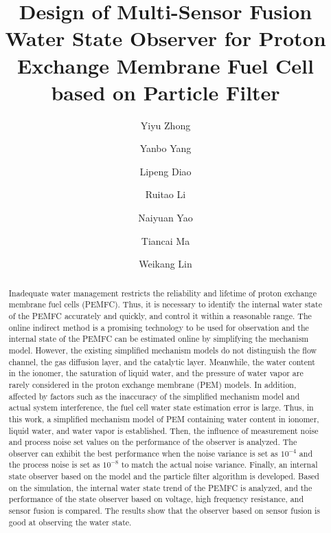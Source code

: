\documentclass[preprint]{elsarticle}
\title{Design of Multi-Sensor Fusion Water State Observer for Proton Exchange Membrane Fuel Cell based on Particle Filter}
\author[a]{Yiyu Zhong}
\author[a]{Yanbo Yang\corref{mycorrespondingauthor}}
\author[c]{Lipeng Diao}
\author[a]{Ruitao Li}
\author[a]{Naiyuan Yao}
\author[a,b]{Tiancai Ma}
\author[a]{Weikang Lin}
\begin{document}
\begin{abstract}

    Inadequate water management restricts the reliability and lifetime of proton exchange membrane fuel cells (PEMFC). Thus, it is necessary to identify the internal water state of the PEMFC accurately and quickly, and control it within a reasonable range. The online indirect method is a promising technology to be used for observation and the internal state of the PEMFC can be estimated online by simplifying the mechanism model. However, the existing simplified mechanism models do not distinguish the flow channel, the gas diffusion layer, and the catalytic layer. Meanwhile, the water content in the ionomer, the saturation of liquid water, and the pressure of water vapor are rarely considered in the proton exchange membrane (PEM) models. In addition, affected by factors such as the inaccuracy of the simplified mechanism model and actual system interference, the fuel cell water state estimation error is large. Thus, in this work, a simplified mechanism model of PEM containing water content in ionomer, liquid water, and water vapor is established. Then, the influence of measurement noise and process noise set values on the performance of the observer is analyzed. The observer can exhibit the best performance when the noise variance is set as $10^{-4}$ and the process noise is set as $10^{-8}$ to match the actual noise variance. Finally, an internal state observer based on the model and the particle filter algorithm is developed. Based on the simulation, the internal water state trend of the PEMFC is analyzed, and the performance of the state observer based on voltage, high frequency resistance, and sensor fusion is compared. The results show that the observer based on sensor fusion is good at observing the water state. 
\end{abstract}
\maketitle





\end{document}
